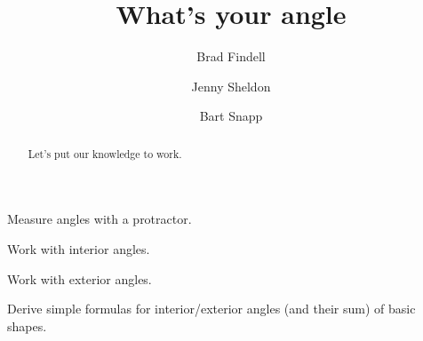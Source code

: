 \documentclass[nooutcomes,noauthor,hints,12pt]{ximera}
\title{What's your angle}
\author{Brad Findell \and Jenny Sheldon \and Bart Snapp}
\begin{document}
\begin{abstract}
  Let's put our knowledge to work. 
\end{abstract}
\maketitle


\begin{listOutcomes}
\item Measure angles with a protractor.
\item Work with interior angles.
\item Work with exterior angles.
\item Derive simple formulas for interior/exterior angles (and their
  sum) of basic shapes.
\end{listOutcomes}

\mynewpage



 
       
\end{document}
